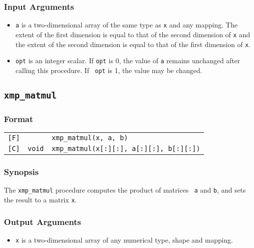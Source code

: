 \subsubsection*{Input Arguments}
\begin{itemize}
 \item {\tt a} is a two-dimensional array of the same type as {\tt x}
       and any mapping. The extent of the first dimension is equal to
       that of the second dimension of {\tt x} and the extent of the
       second dimension is equal to that of the first dimension of
       {\tt x}.
 \item {\tt opt} is an integer scalar. If {\tt opt} is 0, the value of
       {\tt a} remains unchanged after calling this procedure. If {\tt
       opt} is 1, the value may be changed.
\end{itemize}


\subsection{\tt xmp\_matmul}

\subsubsection*{Format}

\begin{tabular}{lll}

\verb![F]!&            & {\tt xmp\_matmul(x, a, b)}\\

\verb![C]!& {\tt void} & {\tt xmp\_matmul(x[:][:], a[:][:], b[:][:])}\\

\end{tabular}

\subsubsection*{Synopsis}

The {\tt xmp\_matmul} procedure computes the product of matrices {\tt
a} and {\tt b}, and sets the result to a matrix {\tt x}.

\subsubsection*{Output Arguments}
\begin{itemize}
 \item {\tt x} is a two-dimensional array of any numerical type, shape
       and mapping.
\end{itemize}

